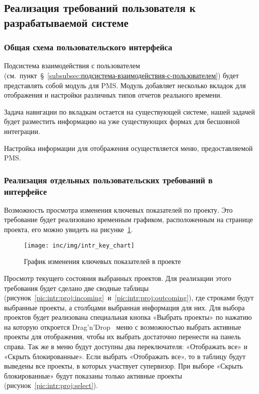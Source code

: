 \subsection{Реализация требований пользователя к разрабатываемой системе}

\subsubsection{Общая схема пользовательского интерфейса}

Подсистема взаимодействия с пользователем (см.~пункт~\S~\ref{subsubsec:подсистема-взаимодействия-с-пользователем})
будет представлять собой модуль для PMS\@.
Модуль добавляет несколько вкладок для отображения и настройки различных
типов отчетов реального времени.

Задача навигации по вкладкам остается на существующей системе,
нашей задачей будет разместить информацию на уже существующих формах для бесшовной интеграции.

Настройка информации для отображения осуществляется меню, предоставляемой PMS\@.

\subsubsection{Реализация отдельных пользовательских требований в интерфейсе}

Возможность просмотра изменения ключевых показателей по проекту.
Это требование будет реализовано временным графиком, расположенным на странице проекта, его можно увидеть на рисунке~\ref{pic:intr:proj:keyval}.

\begin{figure}[!ht]
    \centering
    \texttt{[image: inc/img/intr\_key\_chart]}
    \caption{График изменения ключевых показателей в проекте}
    \label{pic:intr:proj:keyval}
\end{figure}

Просмотр текущего состояния выбранных проектов.
Для реализации этого требования будет сделано две сводные таблицы (рисунок~\ref{pic:intr:proj:incoming}~и~\ref{pic:intr:proj:outcoming}),
где строками будут выбранные проекты, а столбцами выбранная информация для них.
Для выбора проектов будет реализована специальная кнопка «Выбрать проекты»
по нажатию на которую откроется Drag’n’Drop~\cite{Drag-and-drop}
меню с возможностью
выбрать активные проекты для отображения,
чтобы их выбрать достаточно перенести на панель справа.
Так же в меню будут доступны два переключателя:
«Отображать все» и «Скрыть блокированные».
Если выбрать «Отображать все», то в таблицу будут выведены все проекты,
в которых участвует супервизор.
При выборе «Скрыть блокированные» будут показаны только активные проекты (рисунок~\ref{pic:intr:proj:select}).


